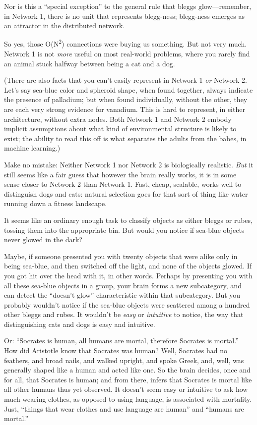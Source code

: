{
 Nor is this a ``special
exception'' to the general rule that bleggs
glow---remember, in Network 1, there is no unit that represents
blegg-ness; blegg-ness emerges as an attractor in the distributed
network.}

{
 So yes, those O(N\textsuperscript{2}) connections were buying us
something. But not very much. Network 1 is not \textit{more} useful on
most real-world problems, where you rarely find an animal stuck halfway
between being a cat and a dog.}

{
 (There are also facts that you can't easily
represent in Network 1 \textit{or} Network 2. Let's say
sea-blue color and spheroid shape, when found together, always indicate
the presence of palladium; but when found individually, without the
other, they are each very strong evidence for vanadium. This is hard to
represent, in either architecture, without extra nodes. Both Network 1
and Network 2 embody implicit assumptions about what kind of
environmental structure is likely to exist; the ability to read this
off is what separates the adults from the babes, in machine learning.)}

{
 Make no mistake: Neither Network 1 nor Network 2 is biologically
realistic. \textit{But} it still seems like a fair guess that however
the brain really works, it is in some sense closer to Network 2 than
Network 1. Fast, cheap, scalable, works well to distinguish dogs and
cats: natural selection goes for that sort of thing like water running
down a fitness landscape.}

{
 It seems like an ordinary enough task to classify objects as
either bleggs or rubes, tossing them into the appropriate bin. But
would you notice if sea-blue objects never glowed in the dark?}

{
 Maybe, if someone presented you with twenty objects that were
alike only in being sea-blue, and then switched off the light, and none
of the objects glowed. If you got hit over the head with it, in other
words. Perhaps by presenting you with all these sea-blue objects in a
group, your brain forms a new subcategory, and can detect the
``doesn't glow''
characteristic within that subcategory. But you probably
wouldn't notice if the sea-blue objects were scattered
among a hundred other bleggs and rubes. It wouldn't be
\textit{easy} or \textit{intuitive} to notice, the way that
distinguishing cats and dogs is easy and intuitive.}

{
 Or: ``Socrates is human, all humans are mortal,
therefore Socrates is mortal.'' How did Aristotle
know that Socrates was human? Well, Socrates had no feathers, and broad
nails, and walked upright, and spoke Greek, and, well, was generally
shaped like a human and acted like one. So the brain decides, once and
for all, that Socrates is human; and from there, infers that Socrates
is mortal like all other humans thus yet observed. It
doesn't seem easy or intuitive to ask how much wearing
clothes, as opposed to using language, is associated with mortality.
Just, ``things that wear clothes and use language are
human'' and ``humans are
mortal.''}

